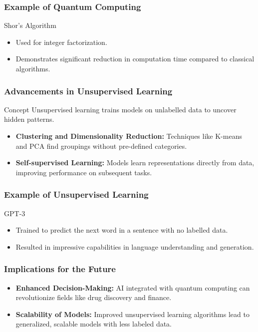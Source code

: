 \documentclass[aspectratio=169]{beamer}
\begin{document}
\begin{frame}[fragile]
    \frametitle{Example of Quantum Computing}
    \begin{block}{Shor’s Algorithm}
        \begin{itemize}
            \item Used for integer factorization.
            \item Demonstrates significant reduction in computation time compared to classical algorithms.
        \end{itemize}
    \end{block}
\end{frame}

\begin{frame}[fragile]
    \frametitle{Advancements in Unsupervised Learning}
    \begin{block}{Concept}
        Unsupervised learning trains models on unlabelled data to uncover hidden patterns.
    \end{block}
    
    \begin{itemize}
        \item \textbf{Clustering and Dimensionality Reduction:} Techniques like K-means and PCA find groupings without pre-defined categories.
        \item \textbf{Self-supervised Learning:} Models learn representations directly from data, improving performance on subsequent tasks.
    \end{itemize}
\end{frame}

\begin{frame}[fragile]
    \frametitle{Example of Unsupervised Learning}
    \begin{block}{GPT-3}
        \begin{itemize}
            \item Trained to predict the next word in a sentence with no labelled data.
            \item Resulted in impressive capabilities in language understanding and generation.
        \end{itemize}
    \end{block}
\end{frame}

\begin{frame}[fragile]
    \frametitle{Implications for the Future}
    \begin{itemize}
        \item \textbf{Enhanced Decision-Making:} AI integrated with quantum computing can revolutionize fields like drug discovery and finance.
        \item \textbf{Scalability of Models:} Improved unsupervised learning algorithms lead to generalized, scalable models with less labeled data.
    \end{itemize}
\end{frame}
\end{document}
